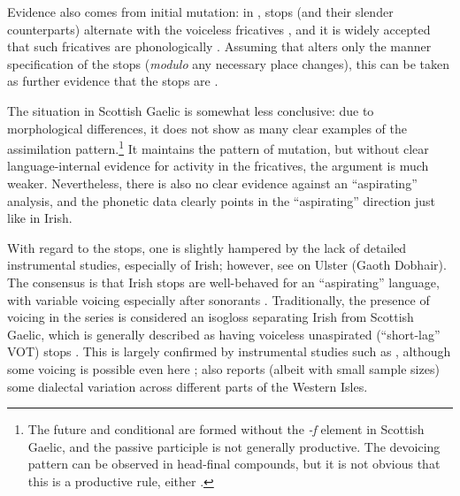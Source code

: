 \documentclass[output=paper,colorlinks,citecolor=brown]{langscibook}
\begin{document}
Evidence also comes from initial mutation: in ,  stops  (and their slender counterparts) alternate with the voiceless fricatives \ipa{[f~h~x]}, and it is widely accepted that such fricatives are phonologically  . Assuming that  alters only the manner specification of the stops (\emph{modulo} any necessary place changes), this can be taken as further evidence that the  stops are .

The situation in Scottish Gaelic is somewhat less conclusive: due to morphological differences, it does not show as many clear examples of the assimilation pattern.\footnote{The future and conditional are formed without the \textit{-f} element in Scottish Gaelic, and the passive participle is not generally productive. The devoicing pattern can be observed in head\hyp final compounds, but it is not obvious that this is a productive rule, either \parencite[cf.][]{stifter2015from}.} It maintains the pattern of mutation, but without clear language\hyp internal evidence for  activity in the fricatives, the argument is much weaker. Nevertheless, there is also no clear evidence against an \enquote{aspirating} analysis, and the phonetic data clearly points in the \enquote{aspirating} direction just like in Irish.

With regard to the  stops, one is slightly hampered by the lack of detailed instrumental studies, especially of Irish; however, see \citet{nichasaide1986preaspiration} on Ulster (Gaoth Dobhair). The consensus is that Irish  stops are well\hyp behaved for an \enquote{aspirating} language, with variable voicing especially after sonorants \parencite[cf. again][]{óraghallaigh2014fuaimeanna}. Traditionally, the presence of voicing in the  series is considered an isogloss separating Irish from Scottish Gaelic, which is generally described as having voiceless unaspirated (\enquote{short\hyp lag} VOT)  stops \parencites[146 sqq.;]{orahilly}{omurchu85}{robinson2007}. This is largely confirmed by instrumental studies such as \textcite{ladefogedetal-scg}, although some voicing is possible even here \parencite{nance2013pre}; \textcite{nichasaide1986preaspiration} also reports (albeit with small sample sizes) some dialectal variation across different parts of the Western Isles.
\end{document}

